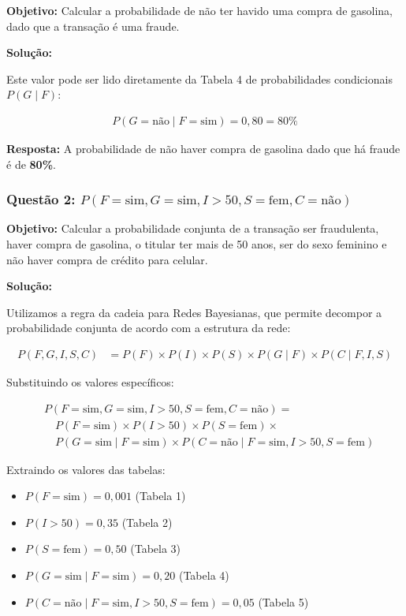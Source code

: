 \documentclass[a4paper,12pt]{article}
\begin{document}
\textbf{Objetivo:} Calcular a probabilidade de não ter havido uma compra de gasolina, dado que a transação é uma fraude.

\textbf{Solução:}

Este valor pode ser lido diretamente da Tabela 4 de probabilidades condicionais $P(G \mid F)$:

\begin{align}
P(G=\text{não} \mid F=\text{sim}) = 0,80 = 80\%
\end{align}

\textbf{Resposta:} A probabilidade de não haver compra de gasolina dado que há fraude é de \textbf{80\%}.

\subsubsection{Questão 2: \texorpdfstring{$P(F=\text{sim}, G=\text{sim}, I>50, S=\text{fem}, C=\text{não})$}{P(F=sim, G=sim, I>50, S=fem, C=não)}}

\textbf{Objetivo:} Calcular a probabilidade conjunta de a transação ser fraudulenta, haver compra de gasolina, o titular ter mais de 50 anos, ser do sexo feminino e não haver compra de crédito para celular.

\textbf{Solução:}

Utilizamos a regra da cadeia para Redes Bayesianas, que permite decompor a probabilidade conjunta de acordo com a estrutura da rede:

\begin{align}
P(F, G, I, S, C) &= P(F) \times P(I) \times P(S) \times P(G \mid F) \times P(C \mid F, I, S)
\end{align}

Substituindo os valores específicos:

\begin{align}
&P(F=\text{sim}, G=\text{sim}, I>50, S=\text{fem}, C=\text{não}) = \nonumber \\
&\quad P(F=\text{sim}) \times P(I>50) \times P(S=\text{fem}) \times \nonumber \\
&\quad P(G=\text{sim} \mid F=\text{sim}) \times P(C=\text{não} \mid F=\text{sim}, I>50, S=\text{fem})
\end{align}

Extraindo os valores das tabelas:
\begin{itemize}
    \item $P(F=\text{sim}) = 0,001$ (Tabela 1)
    \item $P(I>50) = 0,35$ (Tabela 2)
    \item $P(S=\text{fem}) = 0,50$ (Tabela 3)
    \item $P(G=\text{sim} \mid F=\text{sim}) = 0,20$ (Tabela 4)
    \item $P(C=\text{não} \mid F=\text{sim}, I>50, S=\text{fem}) = 0,05$ (Tabela 5)
\end{itemize}
\end{document}
